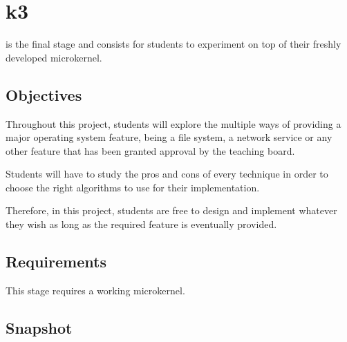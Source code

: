 %
%
%
%
%
%

%
%

\chapter{k3}
\label{chapter:k3}

 is the final stage and consists for students to experiment on top
of their freshly developed microkernel.

\newpage

%
%

%
%

\section{Objectives}

Throughout this project, students will explore the multiple ways of
providing a major operating system feature, being a file system, a
network service or any other feature that has been granted approval by
the teaching board.

Students will have to study the pros and cons of every technique in order to
choose the right algorithms to use for their implementation.

Therefore, in this project, students are free to design and implement whatever
they wish as long as the required feature is eventually provided.

%
%

\section{Requirements}

This stage requires a working microkernel.

%
%

\section{Snapshot}

